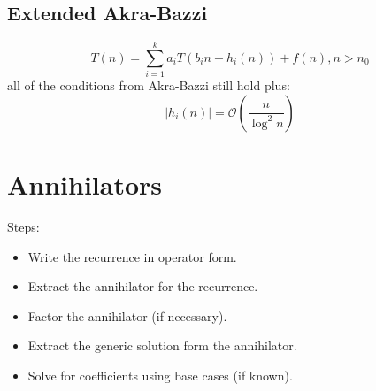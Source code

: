 \begin{multicols}{5}
\subsection{Extended Akra-Bazzi}
\[
	T(n) = \sum_{i=1}^ka_iT(b_in+h_i(n))+f(n), n > n_0
\]
all of the conditions from Akra-Bazzi still hold plus:
\[
	|h_i(n)| = \mathcal{O}(\frac{n}{\log^2n})
\]

\section{Annihilators}
Steps:
\begin{itemize}
	\item Write the recurrence in operator form.
	\item Extract the annihilator for the recurrence.
	\item Factor the annihilator (if necessary).
	\item Extract the generic solution form the annihilator.
	\item Solve for coefficients using base cases (if known).
\end{itemize}
\end{multicols}

